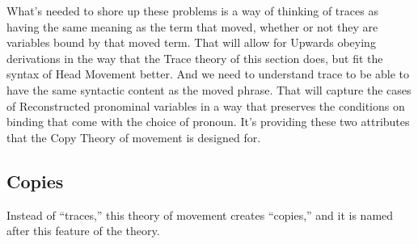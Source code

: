 What's needed to shore up these problems is a way of thinking of traces as having the same meaning as the term that moved, whether or not they are variables bound by that moved term. That will allow for Upwards obeying derivations in the way that the Trace theory of this section does, but fit the syntax of Head Movement better. And we need to understand trace to be able to have the same syntactic content as the moved phrase. That will capture the cases of Reconstructed pronominal variables in a way that preserves the conditions on binding that come with the choice of pronoun. It's providing these two attributes that the Copy Theory of movement is designed for.

\subsection{Copies}
\label{sec:copies}

Instead of ``traces,'' this theory of movement creates ``copies,'' and it is named after this feature of the theory.

